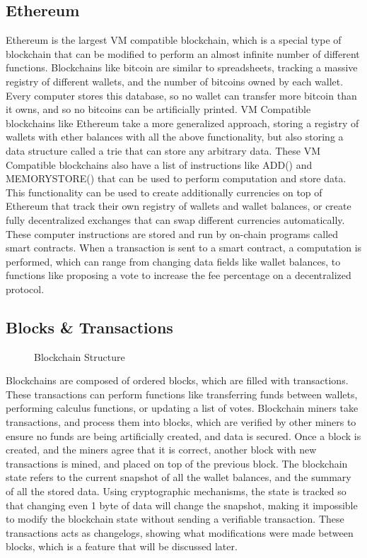 \documentclass[letterpaper,twocolumn]{article}
\begin{document}
\subsection*{Ethereum}
Ethereum is the largest VM compatible blockchain, which is a special type of blockchain that can be modified to perform an almost infinite number of different functions.  Blockchains like bitcoin are similar to spreadsheets, tracking a massive registry of different wallets, and the number of bitcoins owned by each wallet.  Every computer stores this database, so no wallet can transfer more bitcoin than it owns, and so no bitcoins can be artificially printed.   VM Compatible blockchains like Ethereum take a more generalized approach, storing a registry of wallets with ether balances with all the above functionality, but also storing a data structure called a trie that can store any arbitrary data.  These VM Compatible blockchains also have a list of instructions like ADD() and MEMORYSTORE() that can be used to perform computation and store data.  This functionality can be used to create additionally currencies on top of Ethereum that track their own registry of wallets and wallet balances, or create fully decentralized exchanges that can swap different currencies automatically.  These computer instructions are stored and run by on-chain programs called smart contracts.  When a transaction is sent to a smart contract, a computation is performed, which can range from changing data fields like wallet balances, to functions like proposing a vote to increase the fee percentage on a decentralized protocol.

\subsection*{Blocks \& Transactions}
\begin{figure}[h!]
	\caption{Blockchain Structure}\label{fig:block_chain}
\end{figure}
Blockchains are composed of ordered blocks, which are filled with transactions.  These transactions can perform functions like transferring funds between wallets, performing calculus functions, or updating a list of votes.  Blockchain miners take transactions, and process them into blocks, which are verified by other miners to ensure no funds are being artificially created, and data is secured.  Once a block is created, and the miners agree that it is correct, another block with new transactions is mined, and placed on top of the previous block.  The blockchain state refers to the current snapshot of all the wallet balances, and the summary of all the stored data.  Using cryptographic mechanisms, the state is tracked so that changing even 1 byte of data will change the snapshot, making it impossible to modify the blockchain state without sending a verifiable transaction.  These transactions acts as changelogs, showing what modifications were made between blocks, which is a feature that will be discussed later.
\end{document}
